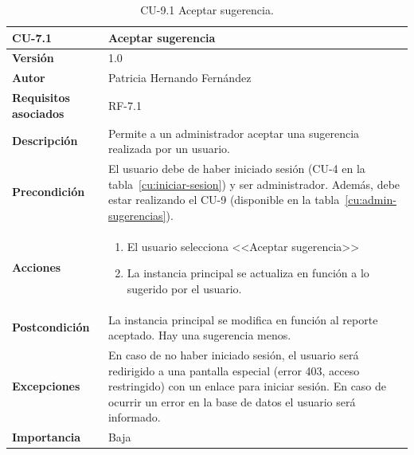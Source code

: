 \begin{table}[p]
	\centering
	\begin{tabularx}{\linewidth}{ p{} p{} }
		\toprule
		\textbf{CU-7.1}    & \textbf{Aceptar sugerencia}\\
		\toprule
		\textbf{Versión}              & 1.0    \\
		\textbf{Autor}                & Patricia Hernando Fernández \\
		\textbf{Requisitos asociados} & RF-7.1 \\
		\textbf{Descripción}          & Permite a un administrador aceptar una sugerencia realizada por un usuario.\\
		\textbf{Precondición}         & El usuario debe de haber iniciado sesión (CU-4 en la tabla~\ref{cu:iniciar-sesion}) y ser administrador. Además, debe estar realizando el CU-9 (disponible en la tabla~\ref{cu:admin-sugerencias}). \\
		\textbf{Acciones}             &
		\begin{enumerate}
			\def\labelenumi{\arabic{enumi}.}
			\tightlist
			\item El usuario selecciona <<Aceptar sugerencia>>
			\item La instancia principal se actualiza en función a lo sugerido por el usuario.
		\end{enumerate}\\
		\textbf{Postcondición}        & La instancia principal se modifica en función al reporte aceptado. Hay una sugerencia menos. \\
		\textbf{Excepciones}          & En caso de no haber iniciado sesión, el usuario será redirigido a una pantalla especial (error 403, acceso restringido) con un enlace para iniciar sesión. En caso de ocurrir un error en la base de datos el usuario será informado.\\
		\textbf{Importancia}          & Baja \\
		\bottomrule
	\end{tabularx}
	\caption{CU-9.1 Aceptar sugerencia.}
	\label{cu:aceptar-sugerencia}
\end{table}


